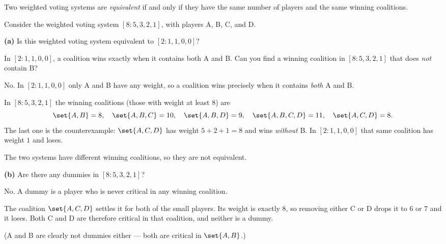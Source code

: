 \documentclass[12pt]{ximera}
\begin{document}
\begin{problem}
Two weighted voting systems are \emph{equivalent} if and only if they have the same
number of players and the same winning coalitions.

Consider the weighted voting system $[8:5,3,2,1]$, with players A, B, C, and D.

\begin{prompt}
\textbf{(a)} Is this weighted voting system equivalent to $[2:1,1,0,0]$?

\begin{multipleChoice}
\end{multipleChoice}

\begin{hint}
In $[2:1,1,0,0]$, a coalition wins exactly when it contains both A and B. Can you find
a winning coalition in $[8:5,3,2,1]$ that does \emph{not} contain B?
\end{hint}

\begin{feedback}
No. In $[2:1,1,0,0]$ only A and B have any weight, so a coalition wins precisely when
it contains \emph{both} A and B.

In $[8:5,3,2,1]$ the winning coalitions (those with weight at least $8$) are
\[
\set{A,B}=8,\quad \set{A,B,C}=10,\quad \set{A,B,D}=9,\quad \set{A,B,C,D}=11,\quad
\set{A,C,D}=8.
\]
The last one is the counterexample: $\set{A,C,D}$ has weight $5+2+1=8$ and wins
\emph{without} B. In $[2:1,1,0,0]$ that same coalition has weight $1$ and loses.

The two systems have different winning coalitions, so they are not equivalent.
\end{feedback}
\end{prompt}

\begin{prompt}
\textbf{(b)} Are there any dummies in $[8:5,3,2,1]$?

\begin{multipleChoice}
\end{multipleChoice}

\begin{feedback}
No. A dummy is a player who is never critical in any winning coalition.

The coalition $\set{A,C,D}$ settles it for both of the small players. Its weight is
exactly $8$, so removing either C or D drops it to $6$ or $7$ and it loses. Both C and
D are therefore critical in that coalition, and neither is a dummy.

(A and B are clearly not dummies either --- both are critical in $\set{A,B}$.)
\end{feedback}
\end{prompt}
\end{problem}
\end{document}

